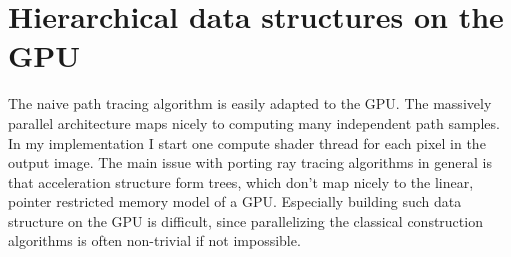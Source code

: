 \documentclass{ACGSeminar}
\begin{document}
\section{Hierarchical data structures on the GPU} \label{gpu-adapting}
The naive path tracing algorithm is easily adapted to the GPU. The massively parallel architecture maps nicely to computing many independent path samples. In my implementation I start one compute shader thread for each pixel in the output image. The main issue with porting ray tracing algorithms in general is that acceleration structure form trees, which don't map nicely to the linear, pointer restricted memory model of a GPU. Especially building such data structure on the GPU is difficult, since parallelizing the classical construction algorithms is often non-trivial if not impossible. \cite[1]{Karras:2012:MPC:2383795.2383801}
\end{document}
